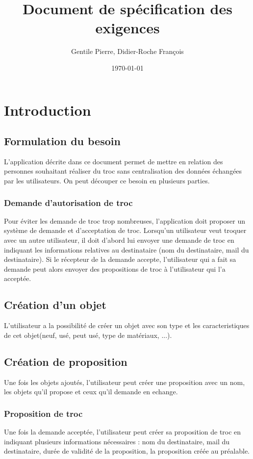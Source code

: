 \documentclass{article}
\author{Gentile Pierre, Didier-Roche François}
\date{\today}
\title{Document de spécification des exigences}
\begin{document}
\maketitle

\newpage
\tableofcontents
\newpage


\section{Introduction}
\subsection{Formulation du besoin}
L'application décrite dans ce document permet de mettre en relation des personnes souhaitant réaliser du troc sans centralisation des données échangées par les utilisateurs. On peut découper ce besoin en plusieurs parties.
\subsubsection{Demande d'autorisation de troc}
Pour éviter les demande de troc trop nombreuses, l'application doit proposer un système de demande et d'acceptation de troc. Lorsqu'un utilisateur veut troquer avec un autre utilisateur, il doit d'abord lui envoyer une demande de troc en indiquant les informations relatives au destinataire (nom du destinataire, mail du destinataire). Si le récepteur de la demande accepte, l'utilisateur qui a fait sa demande peut alors envoyer des propositions de troc à l'utilisateur qui l'a acceptée.
\subsection{Création d'un objet}
L'utilisateur a la possibilité de créer un objet avec son type et les caracteristiques de cet objet(neuf, usé, peut usé, type de matériaux, ...).
\subsection{Création de proposition}
Une fois les objets ajoutés, l'utilisateur peut créer une proposition avec un nom,
les objets qu'il propose et ceux qu'il demande en echange.
\subsubsection{Proposition de troc}
Une fois la demande acceptée, l'utilisateur peut créer sa proposition de troc en indiquant plusieurs informations nécessaires : nom du destinataire, mail du destinataire, durée de validité de la proposition, la proposition créée au préalable.
\end{document}
